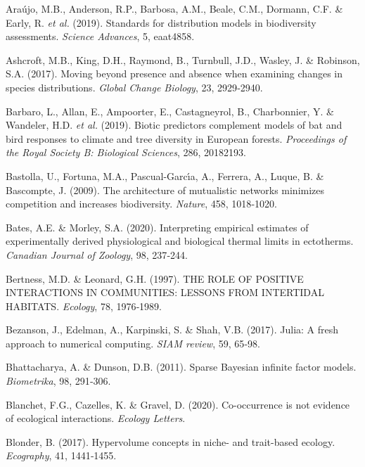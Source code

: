 \documentclass[12pt,]{article}
\newlength{\cslhangindent}
\newenvironment{cslreferences}%
  {\setlength{\parindent}{0pt}%
  \everypar{\setlength{\hangindent}{\cslhangindent}}\ignorespaces}%
  {\par}
\begin{document}
\hypertarget{refs}{}
\begin{cslreferences}
\leavevmode\hypertarget{ref-Araujo_2019}{}%
Araújo, M.B., Anderson, R.P., Barbosa, A.M., Beale, C.M., Dormann, C.F.
\& Early, R. \emph{et al.} (2019). Standards for distribution models in
biodiversity assessments. \emph{Science Advances}, 5, eaat4858.

\leavevmode\hypertarget{ref-Ashcroft_2017}{}%
Ashcroft, M.B., King, D.H., Raymond, B., Turnbull, J.D., Wasley, J. \&
Robinson, S.A. (2017). Moving beyond presence and absence when examining
changes in species distributions. \emph{Global Change Biology}, 23,
2929‑2940.

\leavevmode\hypertarget{ref-Barbaro_2019}{}%
Barbaro, L., Allan, E., Ampoorter, E., Castagneyrol, B., Charbonnier, Y.
\& Wandeler, H.D. \emph{et al.} (2019). Biotic predictors complement
models of bat and bird responses to climate and tree diversity in
European forests. \emph{Proceedings of the Royal Society B: Biological
Sciences}, 286, 20182193.

\leavevmode\hypertarget{ref-Bastolla_2009}{}%
Bastolla, U., Fortuna, M.A., Pascual-Garcı́a, A., Ferrera, A., Luque, B.
\& Bascompte, J. (2009). The architecture of mutualistic networks
minimizes competition and increases biodiversity. \emph{Nature}, 458,
1018‑1020.

\leavevmode\hypertarget{ref-Bates_2020}{}%
Bates, A.E. \& Morley, S.A. (2020). Interpreting empirical estimates of
experimentally derived physiological and biological thermal limits in
ectotherms. \emph{Canadian Journal of Zoology}, 98, 237‑244.

\leavevmode\hypertarget{ref-Bertness_1997}{}%
Bertness, M.D. \& Leonard, G.H. (1997). THE ROLE OF POSITIVE
INTERACTIONS IN COMMUNITIES: LESSONS FROM INTERTIDAL HABITATS.
\emph{Ecology}, 78, 1976‑1989.

\leavevmode\hypertarget{ref-Bezanson_2017}{}%
Bezanson, J., Edelman, A., Karpinski, S. \& Shah, V.B. (2017). Julia: A
fresh approach to numerical computing. \emph{SIAM review}, 59, 65‑98.

\leavevmode\hypertarget{ref-Bhattacharya_2011}{}%
Bhattacharya, A. \& Dunson, D.B. (2011). Sparse Bayesian infinite factor
models. \emph{Biometrika}, 98, 291‑306.

\leavevmode\hypertarget{ref-Blanchet_2020}{}%
Blanchet, F.G., Cazelles, K. \& Gravel, D. (2020). Co-occurrence is not
evidence of ecological interactions. \emph{Ecology Letters}.

\leavevmode\hypertarget{ref-Blonder_2017}{}%
Blonder, B. (2017). Hypervolume concepts in niche- and trait-based
ecology. \emph{Ecography}, 41, 1441‑1455.


\end{cslreferences}
\end{document}

